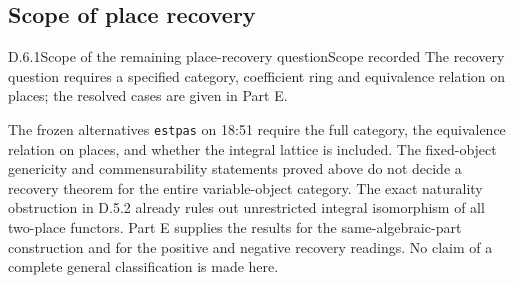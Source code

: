 \subsection{Scope of place recovery}

\begin{result}{D.6.1}{Scope of the remaining place-recovery question}{Scope recorded}
The recovery question requires a specified category, coefficient ring and equivalence relation on places; the resolved cases are given in Part E.
\end{result}
The frozen alternatives \texttt{est\textbar{}pas} on 18:51 require the full category,
the equivalence relation on places, and whether the integral lattice
is included. The fixed-object genericity and commensurability
statements proved above do not decide a recovery theorem for the
entire variable-object category. The exact naturality obstruction
in D.5.2 already rules out unrestricted integral isomorphism of
all two-place functors. Part E supplies the results for
the same-algebraic-part construction and for the positive and
negative recovery readings. No claim of a complete general
classification is made here.

